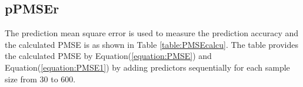 \subsection{pPMSEr}

The prediction mean square error is used to measure the prediction accuracy and the calculated PMSE is as shown in Table \ref{table:PMSEcalcu}. The table provides the calculated PMSE by Equation(\ref{equation:PMSE}) and Equation(\ref{equation:PMSE1}) by adding predictors sequentially for each sample size from 30 to 600. 

\begin{table}[h!]
    \centering{}
\end{table}
